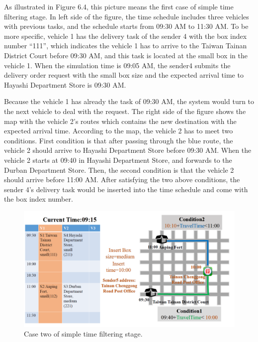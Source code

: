 \documentclass[12pt]{ksthesis}
\begin{document}
\begin{thesis}
{As illustrated in Figure 6.4, this picture means the first case of simple time filtering stage.
In left side of the figure, the time schedule includes three vehicles with previous tasks, and the schedule starts from 09:30 AM to 11:30 AM. To be more specific, vehicle 1 has the delivery task of the sender 4 with the box index number “111”, which indicates the vehicle 1 has to arrive to the Taiwan Tainan District Court before 09:30 AM, and this task is located at the small box in the vehicle 1.
When the simulation time is 09:05 AM, the sender4 submits the delivery order request with the small box size and the expected arrival time to Hayashi Department Store is 09:30 AM.

Because the vehicle 1 has already the task of 09:30 AM, the system would turn to the next vehicle to deal with the request.
The right side of the figure shows the map with the vehicle 2’s routes which contains the new destination with the expected arrival time.
According to the map, the vehicle 2 has to meet two conditions. First condition is that after passing through the blue route, the vehicle 2 should arrive to Hayashi Department Store before 09:30 AM. 
When the vehicle 2 starts at 09:40 in Hayashi Department Store, and forwards to the Durban Department Store. Then, the second condition is that the vehicle 2 should arrive before 11:00 AM.
After satisfying the two above conditions, the sender 4’s delivery task would be inserted into the time schedule and come with the box index number. 

\begin{figure}[H]
\centering
\includegraphics[width=1.14\textwidth]{./Thesis_figures/F6-5_caseTwo_SchedulingStage.PNG}
\caption{\large Case two of simple time filtering stage.}
\vspace{0.5cm}
\label{Fig:CaseTwo_TimeFiltering}
\end{figure}

}
\end{thesis}
\end{document}
